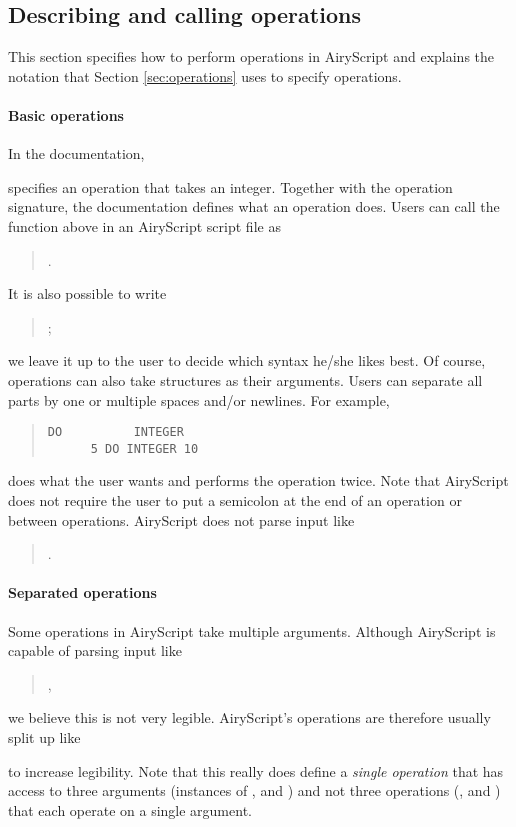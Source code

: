 \subsection{Describing and calling operations}
\label{sec:operations_spec}
This section specifies how to perform operations in AiryScript and explains the
notation that Section \ref{sec:operations} uses to specify operations.


\paragraph{Basic operations}
In the documentation,
\begin{quote}
\end{quote}
specifies an operation that takes an integer. Together with the operation
signature, the documentation defines what an operation does. Users can call the
function above in an AiryScript script file as
\begin{quote}
  .
\end{quote}
It is also possible to write
\begin{quote}
  ;
\end{quote}
we leave it up to the user to decide which syntax he/she likes best.
Of course, operations can also take structures as their arguments. Users can
separate all parts by one or multiple spaces and/or newlines. For example,
\begin{quote}
\begin{verbatim}
DO          INTEGER
      5 DO INTEGER 10
\end{verbatim}
\end{quote}
does what the user wants and performs the operation  twice.
Note that AiryScript does not require the user to put a semicolon at the end of
an operation or between operations.
AiryScript does not parse input like
\begin{quote}
   .
\end{quote}

\paragraph{Separated operations}
Some operations in AiryScript take multiple arguments. Although AiryScript is
capable of parsing input like
\begin{quote}
  ,
\end{quote}
we believe this is not very legible. AiryScript’s operations are therefore
usually split up like
\begin{quote}
\end{quote}
to increase legibility. Note that this really does define a \emph{single
operation} that has access to three arguments (instances of ,
 and ) and not three operations (, 
and ) that each operate on a single argument.

